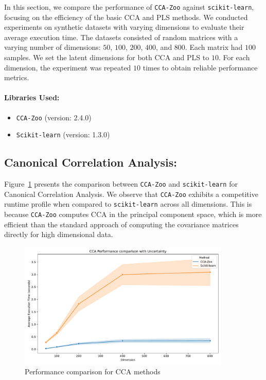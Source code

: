 In this section, we compare the performance of \texttt{CCA-Zoo} against \texttt{scikit-learn}, focusing on the efficiency of the basic CCA and PLS methods.
We conducted experiments on synthetic datasets with varying dimensions to evaluate their average execution time.
The datasets consisted of random matrices with a varying number of dimensions: \(50\), \(100\), \(200\), \(400\), and \(800\).
Each matrix had \(100\) samples.
We set the latent dimensions for both CCA and PLS to \(10\).
For each dimension, the experiment was repeated \(10\) times to obtain reliable performance metrics.

\paragraph{Libraries Used:}
\begin{itemize}
    \item \texttt{CCA-Zoo} (version: 2.4.0)
    \item \texttt{Scikit-learn} (version: 1.3.0)
\end{itemize}

\subsection{Canonical Correlation Analysis:}
Figure~\ref{fig:cca_benchmark} presents the comparison between \texttt{CCA-Zoo} and \texttt{scikit-learn} for Canonical Correlation Analysis.
We observe that \texttt{CCA-Zoo} exhibits a competitive runtime profile when compared to \texttt{scikit-learn} across all dimensions.
This is because \texttt{CCA-Zoo} computes CCA in the principal component space, which is more efficient than the standard approach of computing the covariance matrices directly for high dimensional data.

\begin{figure}[h]
    \centering
    \includegraphics[width=0.9\textwidth]{figures/CCA_Speed_Benchmark}
    \caption{Performance comparison for CCA methods}
    \label{fig:cca_benchmark}
\end{figure}

